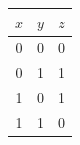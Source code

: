 \begin{tabular}{ccc}\toprule
\(x\)&\(y\)&\(z\)\\\midrule
0&0&0\\
0&1&1\\
1&0&1\\
1&1&0\\
\bottomrule\end{tabular}
